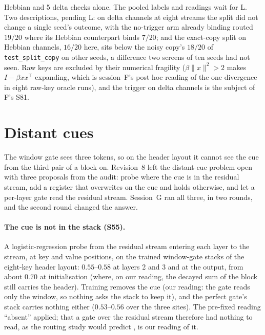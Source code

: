 \documentclass[11pt]{article}
\begin{document}
Hebbian and 5 delta checks alone. The pooled labels and readings wait for L. Two descriptions, pending L: on delta channels at eight streams the split did not change a single seed's outcome, with the no-trigger arm already binding routed $19/20$ where its Hebbian counterpart binds $7/20$; and the exact-copy split on Hebbian channels, $16/20$ here, sits below the noisy copy's $18/20$ of \texttt{test\_split\_copy} on other seeds, a difference two screens of ten seeds had not seen. Raw keys are excluded by their numerical fragility ($\beta\|x\|^2 > 2$ makes $I - \beta x x^\top$ expanding, which is session~F's post hoc reading of the one divergence in eight raw-key oracle runs), and the trigger on delta channels is the subject of F's S81.

\section{Distant cues}
\label{sec:far}

The window gate sees three tokens, so on the header layout it cannot see the cue from the third pair of a block on. Revision~8 left the distant-cue problem open with three proposals from the audit: probe where the cue is in the residual stream, add a register that overwrites on the cue and holds otherwise, and let a per-layer gate read the residual stream. Session~G ran all three, in two rounds, and the second round changed the answer.

\paragraph{The cue is not in the stack (S55).} A logistic-regression probe from the residual stream entering each layer to the stream, at key and value positions, on the trained window-gate stacks of the eight-key header layout: $0.55$--$0.58$ at layers 2 and 3 and at the output, from about $0.70$ at initialisation (where, on our reading, the decayed sum of the block still carries the header). Training removes the cue (our reading: the gate reads only the window, so nothing asks the stack to keep it), and the perfect gate's stack carries nothing either ($0.53$--$0.56$ over the three sites). The pre-fixed reading ``absent'' applied; that a gate over the residual stream therefore had nothing to read, as the routing study would predict \cite{routing}, is our reading of it.
\end{document}
